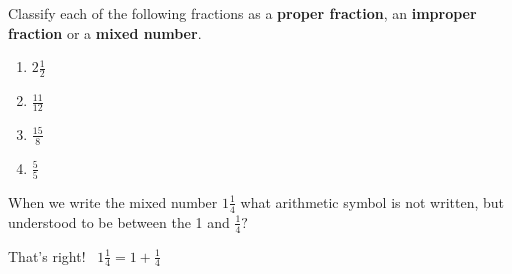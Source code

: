 \documentclass[handout, font=12pt]{ximera}
\begin{document}
\begin{problem}
Classify each of the following fractions as a \textbf{proper fraction}, an \textbf{improper fraction} or a \textbf{mixed number}.

\begin{enumerate}
    \item $\displaystyle 2\frac{1}{2}$
    \begin{multipleChoice}
    \end{multipleChoice}

    \item $\displaystyle \frac{11}{12}$
    \begin{multipleChoice}
    \end{multipleChoice}
    
    \item $\displaystyle \frac{15}{8}$
    \begin{multipleChoice}
    \end{multipleChoice}

    \item $\displaystyle \frac{5}{5}$
    \begin{multipleChoice}
    \end{multipleChoice}

\end{enumerate}
\end{problem}


\begin{problem}
When we write the mixed number $\textstyle 1 \frac{1}{4}$ what arithmetic symbol is not written, but
understood to be between the 1 and $\textstyle \frac{1}{4}?$

\begin{multipleChoice}
\choice{$\mathbf{\times}$}
\choice{$\mathbf{-}$}
\choice[correct]{$\mathbf{+}$}
\choice{$\mathbf{\div}$}
\end{multipleChoice}

\begin{feedback}[correct]
That's right! \ $1 \frac{1}{4} = 1 + \frac{1}{4}$
\end{feedback}

\end{problem}
\end{document}
